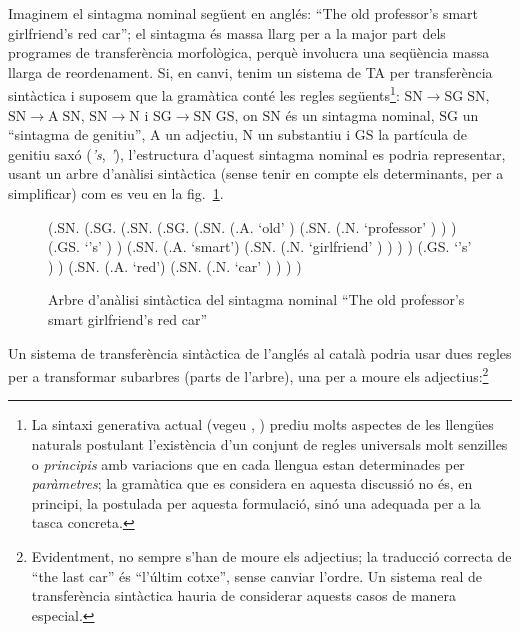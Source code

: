 Imaginem el sintagma nominal següent en anglés: ``The old professor's
smart girlfriend's red car''; el sintagma és massa llarg per a la
major part dels programes de transferència morfològica, perquè
involucra una seqüència massa llarga de reordenament.  Si, en canvi,
tenim un sistema de TA per transferència sintàctica i suposem que la
gramàtica conté les regles següents\footnote{La sintaxi generativa
  actual (vegeu \citealt{chomsky96b}, \cite{ramos92}) prediu molts aspectes de les
  llengües naturals postulant l'existència d'un conjunt de regles
  universals molt senzilles o \emph{principis} amb variacions que en
  cada llengua estan determinades per \emph{paràmetres}; la gramàtica
  que es considera en aquesta discussió no és, en principi, la
  postulada per aquesta formulació, sinó una adequada per a la tasca
  concreta.}: $\mathrm{SN}\rightarrow \mathrm{SG}\;\mathrm{SN}$, $\mathrm{SN} \rightarrow \mathrm{A}\;\mathrm{SN}$,
$\mathrm{SN}\rightarrow \mathrm{N}$ i $\mathrm{SG}\rightarrow \mathrm{SN}\;\mathrm{GS}$, on $\mathrm{SN}$ és un sintagma
nominal, $\mathrm{SG}$ un ``sintagma de genitiu'', $\mathrm{A}$ un adjectiu, $\mathrm{N}$ un
substantiu i $\mathrm{GS}$ la partícula de genitiu saxó (\emph{'s}, \emph{'}),
l'estructura d'aquest sintagma nominal es podria representar, usant un
arbre d'anàlisi sintàctica (sense tenir en compte els determinants,
per a simplificar) com es veu en la fig.~\ref{fg:arbre1}.
\begin{figure}
\begin{center}
\begin{parsetree}
(.SN. (.SG. (.SN. (.SG. 
                   (.SN. (.A. `old' ) (.SN. (.N. `professor' ) )
                   )
                   (.GS. `{'s}' ) 
                  )
                  (.SN. (.A. `smart') (.SN. (.N. `girlfriend' ) ) )
            )
            (.GS. `{'s}' )
     )
     (.SN. (.A. `red') (.SN. (.N. `car' ) ) ) 
)                  
\end{parsetree}
\end{center}
\caption{Arbre d'anàlisi sintàctica del sintagma nominal
 ``The old professor's smart
girlfriend's red car''}
\label{fg:arbre1}
\end{figure}  
Un sistema de transferència sintàctica de l'anglés al català
podria usar dues regles per a transformar subarbres (parts de
l'arbre), una
per a moure els adjectius:\footnote{Evidentment, no sempre
s'han de moure els adjectius; la traducció correcta de
``the last car'' és ``l'últim cotxe'', sense canviar l'ordre. Un
sistema real de transferència sintàctica hauria de considerar
aquests casos de manera especial.}

